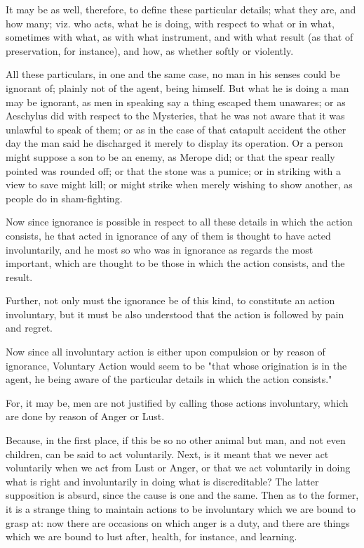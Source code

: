 It may be as well, therefore, to define these particular details; what
they are, and how many; viz. who acts, what he is doing, with respect to
what or in what, sometimes with what, as with what instrument, and with
what result (as that of preservation, for instance), and how, as whether
softly or violently.

All these particulars, in one and the same case, no man in his senses
could be ignorant of; plainly not of the agent, being himself. But
what he is doing a man may be ignorant, as men in speaking say a
thing escaped them unawares; or as Aeschylus did with respect to the
Mysteries, that he was not aware that it was unlawful to speak of them;
or as in the case of that catapult accident the other day the man said
he discharged it merely to display its operation. Or a person might
suppose a son to be an enemy, as Merope did; or that the spear really
pointed was rounded off; or that the stone was a pumice; or in striking
with a view to save might kill; or might strike when merely wishing to
show another, as people do in sham-fighting.

Now since ignorance is possible in respect to all these details in
which the action consists, he that acted in ignorance of any of them is
thought to have acted involuntarily, and he most so who was in ignorance
as regards the most important, which are thought to be those in which
the action consists, and the result.

Further, not only must the ignorance be of this kind, to constitute an
action involuntary, but it must be also understood that the action is
followed by pain and regret.

Now since all involuntary action is either upon compulsion or by reason
of ignorance, Voluntary Action would seem to be "that whose origination
is in the agent, he being aware of the particular details in which the
action consists."

For, it may be, men are not justified by calling those actions
involuntary, which are done by reason of Anger or Lust.

Because, in the first place, if this be so no other animal but man, and
not even children, can be said to act voluntarily. Next, is it meant
that we never act voluntarily when we act from Lust or Anger, or that we
act voluntarily in doing what is right and involuntarily in doing what
is discreditable? The latter supposition is absurd, since the cause
is one and the same. Then as to the former, it is a strange thing to
maintain actions to be involuntary which we are bound to grasp at: now
there are occasions on which anger is a duty, and there are things which
we are bound to lust after, health, for instance, and learning.

